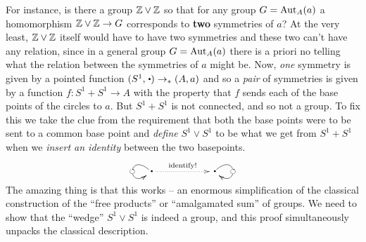 For instance, is there a group $\ZZ\vee%
\ZZ$ so that for any group $G=\mathrm{Aut}_A(a)$ a homomorphism $\ZZ\vee%
\ZZ\to G$ corresponds to {\bf two} symmetries of $a$?  
At the very least, $\mathbb{Z}\vee\mathbb{Z}$ itself would have to have two symmetries and these two can't have any relation, since in a general group $G=\mathrm{Aut}_A(a)$ there is a priori no telling what the relation between the symmetries of $a$ might be.  
Now, \emph{one} symmetry is given by a pointed function $(S^1,\base)\to_*(A,a)$ and so a \emph{pair} of symmetries is given by a function $f:S^1+S^1\to A$ with the property that $f$ sends each of the base points of the circles to $a$.  But $S^1+S^1$ is not connected, and so not a group.  To fix this we take the clue from the requirement that both the base points were to be sent to a common base point and \emph{define} $S^1\vee S^1$ to be what we get from $S^1+S^1$ when we \emph{insert an identity} between the two basepoints.
$$\xymatrix{\base\ar@(ul,dl)[]|{\Sloop}\ar@{.>}[rr]^{\text{identify!}}&&\base\ar@(ur,dr)[]|{\Sloop}}
$$
The amazing thing is that this works -- an enormous simplification of the classical construction of the ``free products'' or ``amalgamated sum'' of groups.  We need to show that the ``wedge'' $S^1\vee S^1$ is indeed a group, and this proof simultaneously unpacks the classical description.



